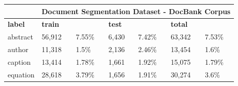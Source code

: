 \begin{table}[!ht]
\centering
\begin{tabular}{l|llllll|}
\cline{2-7}
\multicolumn{1}{c|}{}                & \multicolumn{6}{c|}{Document Segmentation Dataset - DocBank Corpus}                                                                                                                                                                                                                                                                                                                 \\ \hline
\multicolumn{1}{|l|}{\textbf{label}} & \multicolumn{1}{l|}{\cellcolor[HTML]{DAE8FC}\textbf{train}} & \multicolumn{1}{l|}{\cellcolor[HTML]{EFEFEF}\textbf{}} & \multicolumn{1}{l|}{\cellcolor[HTML]{DAE8FC}\textbf{test}} & \multicolumn{1}{l|}{\cellcolor[HTML]{EFEFEF}\textbf{}} & \multicolumn{1}{l|}{\cellcolor[HTML]{DAE8FC}\textbf{total}} & \cellcolor[HTML]{EFEFEF}\textbf{} \\ \hline
\multicolumn{1}{|l|}{abstract}       & \multicolumn{1}{l|}{\cellcolor[HTML]{DAE8FC}56,912}         & \multicolumn{1}{l|}{\cellcolor[HTML]{EFEFEF}7.55\%}    & \multicolumn{1}{l|}{\cellcolor[HTML]{DAE8FC}6,430}         & \multicolumn{1}{l|}{\cellcolor[HTML]{EFEFEF}7.42\%}    & \multicolumn{1}{l|}{\cellcolor[HTML]{DAE8FC}63,342}         & \cellcolor[HTML]{EFEFEF}7.53\%    \\ \hline
\multicolumn{1}{|l|}{author}         & \multicolumn{1}{l|}{\cellcolor[HTML]{DAE8FC}11,318}         & \multicolumn{1}{l|}{\cellcolor[HTML]{EFEFEF}1.5\%}     & \multicolumn{1}{l|}{\cellcolor[HTML]{DAE8FC}2,136}         & \multicolumn{1}{l|}{\cellcolor[HTML]{EFEFEF}2.46\%}    & \multicolumn{1}{l|}{\cellcolor[HTML]{DAE8FC}13,454}         & \cellcolor[HTML]{EFEFEF}1.6\%     \\ \hline
\multicolumn{1}{|l|}{caption}        & \multicolumn{1}{l|}{\cellcolor[HTML]{DAE8FC}13,414}         & \multicolumn{1}{l|}{\cellcolor[HTML]{EFEFEF}1.78\%}    & \multicolumn{1}{l|}{\cellcolor[HTML]{DAE8FC}1,661}         & \multicolumn{1}{l|}{\cellcolor[HTML]{EFEFEF}1.92\%}    & \multicolumn{1}{l|}{\cellcolor[HTML]{DAE8FC}15,075}         & \cellcolor[HTML]{EFEFEF}1.79\%    \\ \hline
\multicolumn{1}{|l|}{equation}       & \multicolumn{1}{l|}{\cellcolor[HTML]{DAE8FC}28,618}         & \multicolumn{1}{l|}{\cellcolor[HTML]{EFEFEF}3.79\%}    & \multicolumn{1}{l|}{\cellcolor[HTML]{DAE8FC}1,656}         & \multicolumn{1}{l|}{\cellcolor[HTML]{EFEFEF}1.91\%}    & \multicolumn{1}{l|}{\cellcolor[HTML]{DAE8FC}30,274}         & \cellcolor[HTML]{EFEFEF}3.6\%     \\ \hline

\end{tabular}
\end{table}
